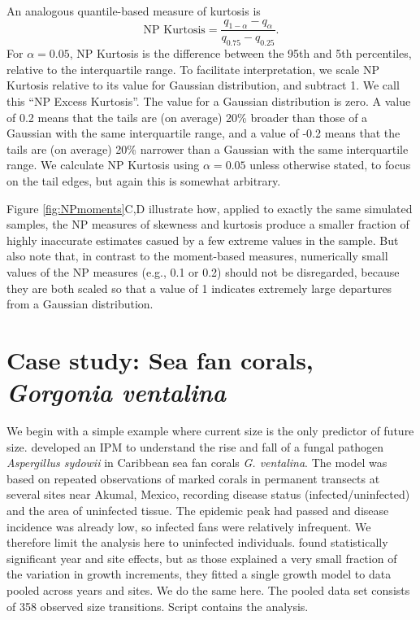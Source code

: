 \documentclass[11pt]{article}
\newcounter{box}
\newcommand{\be}{\begin{equation}}
\newcommand{\ee}{\end{equation}}
\begin{document}
{An analogous quantile-based measure of kurtosis \citep{jones-etal-1994} is 
\be
\mbox{NP Kurtosis}  = \frac{q_{1-\alpha} - q_{\alpha}}{q_{0.75} - q_{0.25}}.
\label{eqn:NPkurt}
\ee
For $\alpha=0.05$, NP Kurtosis is the difference between the 95th and 5th percentiles, relative to the interquartile range. 
To facilitate interpretation, we scale NP Kurtosis relative to its value for Gaussian distribution, and subtract 1. 
We call this ``NP Excess Kurtosis''. The value for a Gaussian distribution is zero. A value of 0.2 means that the tails
are (on average) 20\% broader than those of a Gaussian with the same interquartile range, and a value of -0.2 means that the tails
are (on average) 20\% narrower than a Gaussian with the same interquartile range. We calculate NP Kurtosis using $\alpha=0.05$ 
unless otherwise stated, to focus on the tail edges, but again this is somewhat arbitrary. 

Figure \ref{fig:NPmoments}C,D illustrate how, applied to exactly the same simulated samples, the NP measures of skewness and
kurtosis produce a smaller fraction of highly inaccurate estimates casued by a few extreme values in the sample. But also note
that, in contrast to the moment-based measures, numerically small values of the NP measures (e.g., 0.1 or 0.2) should not be
disregarded, because they are both scaled so that a value of 1 indicates extremely large departures from a Gaussian distribution. 

\section{Case study: Sea fan corals, \emph{Gorgonia ventalina}}
We begin with a simple example where current size is the only predictor of future size. \cite{bruno-etal-2011} developed
an IPM to understand the rise and fall of a fungal pathogen \emph{Aspergillus sydowii} in Caribbean sea fan corals 
\emph{G. ventalina}. The model was based on repeated observations of marked corals in permanent transects at several sites 
near Akumal, Mexico, recording disease status (infected/uninfected) and the area of uninfected tissue. 
The epidemic peak had passed and disease incidence was already low, so infected fans were relatively infrequent. 
We therefore limit the analysis here to uninfected individuals. \citet{bruno-et-al-2011} found statistically significant year
and site effects, but as those explained a very small fraction of the variation in growth increments, they fitted a single growth
model to data pooled across years and sites. We do the same here. The pooled data set consists of 358 observed
size transitions. Script  contains the analysis. 

}
\end{document}
